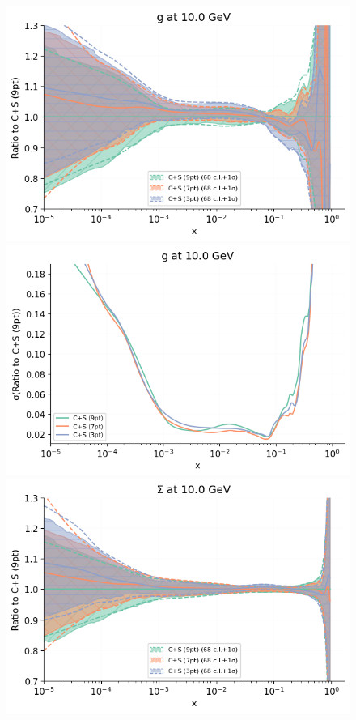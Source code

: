 \begin{figure}[H]
  \begin{center}
    \includegraphics[scale=0.45]{mhous/plots/jplots/j2g.png}
    \includegraphics[scale=0.45]{mhous/plots/jplots/jeg.png}
        \includegraphics[scale=0.45]{mhous/plots/jplots/j2sig.png}

\end{center}
\end{figure}
